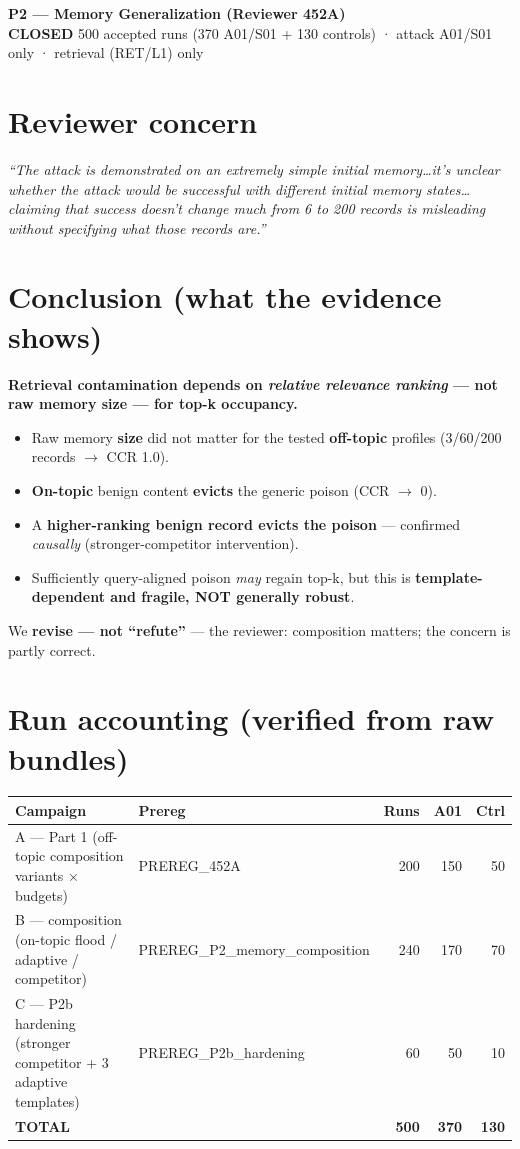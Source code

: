 \documentclass[9pt]{extarticle}
\begin{document}
\begin{center}{\LARGE\bfseries P2 — Memory Generalization (Reviewer 452A)}\\[2pt]
{\large\color{good}\textbf{CLOSED}} \quad\color{soft}\small 500 accepted runs (370 A01/S01 + 130 controls) · attack A01/S01 only · retrieval (RET/L1) only\end{center}

\section{Reviewer concern}
\small\itshape ``The attack is demonstrated on an extremely simple initial memory\ldots it's unclear whether the
attack would be successful with different initial memory states\ldots claiming that success doesn't change much from
6 to 200 records is misleading without specifying what those records are.''

\section{Conclusion (what the evidence shows)}
\normalsize\textbf{Retrieval contamination depends on \emph{relative relevance ranking} — not raw memory size — for top-k occupancy.}
\begin{itemize}\itemsep1pt
\item Raw memory \textbf{size} did not matter for the tested \textbf{off-topic} profiles (3/60/200 records $\to$ CCR 1.0).
\item \textbf{On-topic} benign content \textbf{evicts} the generic poison (CCR $\to$ 0).
\item A \textbf{higher-ranking benign record evicts the poison} — confirmed \emph{causally} (stronger-competitor intervention).
\item Sufficiently query-aligned poison \emph{may} regain top-k, but this is \textbf{template-dependent and fragile, NOT generally robust}.
\end{itemize}
We \textbf{revise — not ``refute''} — the reviewer: composition matters; the concern is partly correct.

\section{Run accounting (verified from raw bundles)}
\small\begin{tabular}{@{}p{6.6cm}p{4.4cm}rrr@{}}\toprule
Campaign & Prereg & Runs & A01 & Ctrl\\\midrule
A — Part 1 (off-topic composition variants $\times$ budgets) & PREREG\_452A & 200 & 150 & 50\\
B — composition (on-topic flood / adaptive / competitor) & PREREG\_P2\_memory\_composition & 240 & 170 & 70\\
C — P2b hardening (stronger competitor + 3 adaptive templates) & PREREG\_P2b\_hardening & 60 & 50 & 10\\\midrule
\textbf{TOTAL} & & \textbf{500} & \textbf{370} & \textbf{130}\\\bottomrule\end{tabular}
\end{document}
